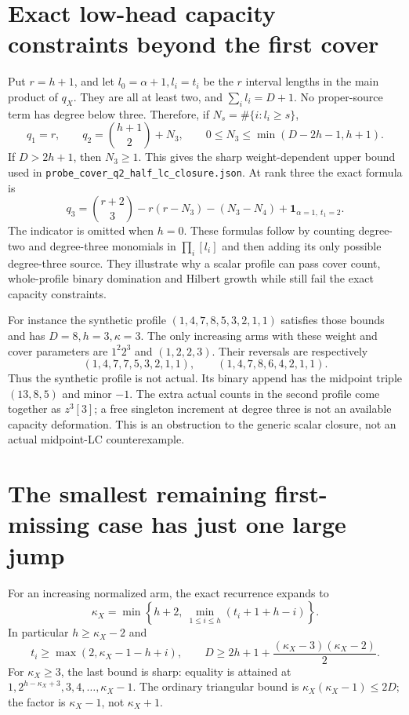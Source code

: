 \section{Exact low-head capacity constraints beyond the first cover}
Put $r=h+1$, and let $l_0=\alpha+1,l_i=t_i$ be the $r$
interval lengths in the main product of $q_X$.
They are all at least two, and $\sum_i l_i=D+1$.
No proper-source term has degree below three. Therefore, if
$N_s=\#\{i:l_i\ge s\}$,
\[
 q_1=r,\qquad q_2=\binom{h+1}{2}+N_3,\qquad
 0\le N_3\le\min(D-2h-1,h+1).
\]
If $D>2h+1$, then $N_3\ge1$.
This gives the sharp weight-dependent upper bound used in
\texttt{probe\_cover\_q2\_half\_lc\_closure.json}.
At rank three the exact formula is
\[
 q_3=\binom{r+2}{3}-r(r-N_3)-(N_3-N_4)
                +\mathbf1_{\alpha=1,\ t_1=2}.
\]
The indicator is omitted when $h=0$.
These formulas follow by counting degree-two and degree-three
monomials in $\prod_i[l_i]$ and then adding its only possible
degree-three source. They illustrate why a scalar profile can
pass cover count, whole-profile binary domination and Hilbert
growth while still fail the exact capacity constraints.

For instance the synthetic profile
$(1,4,7,8,5,3,2,1,1)$ satisfies those bounds and has
$D=8,h=3,\kappa=3$. The only increasing arms with these weight
and cover parameters are $1^2 2^3$ and $(1,2,2,3)$.
Their reversals are respectively
\[
 (1,4,7,7,5,3,2,1,1),\qquad
 (1,4,7,8,6,4,2,1,1).
\]
Thus the synthetic profile is not actual. Its binary append
has the midpoint triple $(13,8,5)$ and minor $-1$.
The extra actual counts in the second profile come together as
$z^3[3]$; a free singleton increment at degree three is not an
available capacity deformation. This is an obstruction to the
generic scalar closure, not an actual midpoint-LC counterexample.

\section{The smallest remaining first-missing case has just one large jump}
For an increasing normalized arm, the exact recurrence expands to
\[
 \kappa_X=\min\left\{h+2,\ \min_{1\le i\le h}
                         (t_i+1+h-i)\right\}.              \tag{1}
\]
In particular $h\ge\kappa_X-2$ and
\[
 t_i\ge\max(2,\kappa_X-1-h+i),\qquad
 D\ge2h+1+\frac{(\kappa_X-3)(\kappa_X-2)}2.                 \tag{2}
\]
For $\kappa_X\ge3$, the last bound is sharp: equality is attained at
$1,2^{h-\kappa_X+3},3,4,\ldots,\kappa_X-1$.
The ordinary triangular bound is
$\kappa_X(\kappa_X-1)\le2D$; the factor is $\kappa_X-1$,
not $\kappa_X+1$.

